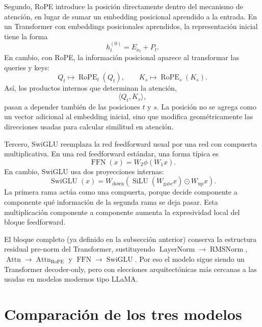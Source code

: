 \documentclass[11pt]{report}
\theoremstyle{definition}
\theoremstyle{plain}
\numberwithin{equation}{section}
\begin{document}
Segundo, RoPE introduce la posición directamente dentro del mecanismo de atención, en lugar de sumar un embedding posicional aprendido a la entrada. En un Transformer con embeddings posicionales aprendidos, la representación inicial tiene la forma
\begin{equation*}
    h_t^{(0)}
    =
    E_{x_t}+P_t.
\end{equation*}
En cambio, con RoPE, la información posicional aparece al transformar las queries y keys:
\begin{equation*}
    Q_t
    \mapsto
    \operatorname{RoPE}_t(Q_t),
    \qquad
    K_s
    \mapsto
    \operatorname{RoPE}_s(K_s).
\end{equation*}
Así, los productos internos que determinan la atención,
\begin{equation*}
    \langle Q_t,K_s\rangle,
\end{equation*}
pasan a depender también de las posiciones \(t\) y \(s\). La posición no se agrega como un vector adicional al embedding inicial, sino que modifica geométricamente las direcciones usadas para calcular similitud en atención.

Tercero, SwiGLU reemplaza la red feedforward usual por una red con compuerta multiplicativa. En una red feedforward estándar, una forma típica es
\begin{equation*}
    \operatorname{FFN}(x)
    =
    W_2\phi(W_1x).
\end{equation*}
En cambio, SwiGLU usa dos proyecciones internas:
\begin{equation*}
    \operatorname{SwiGLU}(x)
    =
    W_{\mathrm{down}}
    \left(
        \operatorname{SiLU}(W_{\mathrm{gate}}x)
        \odot
        W_{\mathrm{up}}x
    \right).
\end{equation*}
La primera rama actúa como una compuerta, porque decide componente a componente qué información de la segunda rama se deja pasar. Esta multiplicación componente a componente aumenta la expresividad local del bloque feedforward.

El bloque completo (ya definido en la subsección anterior) conserva la estructura residual pre-norm del Transformer, sustituyendo \(\operatorname{LayerNorm}\to\operatorname{RMSNorm}\), \(\operatorname{Attn}\to\operatorname{Attn}_{\mathrm{RoPE}}\) y \(\operatorname{FFN}\to\operatorname{SwiGLU}\). Por eso el modelo sigue siendo un Transformer decoder-only, pero con elecciones arquitectónicas más cercanas a las usadas en modelos modernos tipo LLaMA.

\section{Comparación de los tres modelos}
\end{document}
